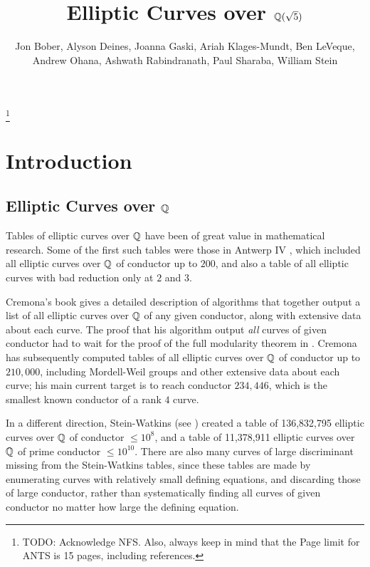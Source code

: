 \documentclass{amsart}
\title{Elliptic Curves over $\mathbb{Q}(\sqrt{5})$}
\author[Bober et al.]{Jon Bober, Alyson Deines, Joanna Gaski, Ariah Klages-Mundt, Ben
  LeVeque, Andrew Ohana, Ashwath Rabindranath, Paul Sharaba, William
  Stein}
\begin{document}
\begin{abstract} 
\end{abstract} 

\maketitle

\footnote{TODO: Acknowledge NFS.  Also, always keep in mind that the
  Page limit for ANTS is 15 pages, including references.}

\section{Introduction}\label{sec:intro}

\subsection{Elliptic Curves over $\mathbb{Q}$}
Tables of elliptic curves over $\mathbb{Q}$ have been of great value in
mathematical research.  Some of the first such tables were those in
Antwerp IV \cite{antwerpiv}, which included all elliptic curves over
$\mathbb{Q}$ of conductor up to $200$, and also a table of all elliptic curves
with bad reduction only at $2$ and $3$.  

Cremona's book \cite{cremona:algs} gives a detailed 
description of algorithms that together output a list of all
elliptic curves over $\mathbb{Q}$ of any given conductor, along with
extensive data about each curve.  The proof that his algorithm output
{\em all} curves of given conductor had to wait for the proof of the
full modularity theorem in \cite{breuil-conrad-diamond-taylor}.  
Cremona has subsequently computed tables \cite{cremona:onlinetables} of all elliptic curves
over $\mathbb{Q}$ of conductor up to $210,\!000$, including Mordell-Weil
groups and other extensive data about each curve; his main current
target is to reach conductor $234,\!446$, which is the smallest known
conductor of a rank $4$ curve.

In a different direction, Stein-Watkins (see \cite{stein-watkins:ants5, bmsw:bulletins}) 
created a table of 136,832,795 elliptic curves over $\mathbb{Q}$ of conductor $\leq 10^8$, and a
table of 11,378,911 elliptic curves over $\mathbb{Q}$ of prime conductor $\leq
10^{10}$. 
There are also many curves of large discriminant missing from the
Stein-Watkins tables, since these tables are made by enumerating
curves with relatively small defining equations, and discarding those
of large conductor, rather than systematically finding all curves of
given conductor no matter how large the defining equation.
\end{document}
